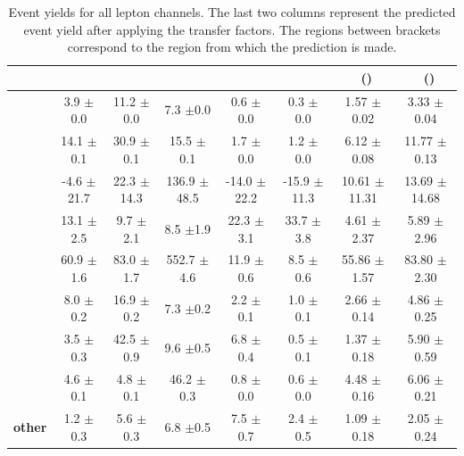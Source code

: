 \begin{landscape}
	\vspace*{\fill}
	\begin{table}[htb!]
	\begin{center}
				\caption{Event yields for all lepton channels. The last two columns represent the predicted event yield after applying the transfer factors. The regions between brackets correspond to the region from which the prediction is made.}
		
		\begin{tabular} {l ccccc|cc}
			\toprule
			& \STSR & \TTSR & \WZCR & \TTCR & \STCR & \STSR\ (\WZCR) & \TTSR\ (\WZCR)  \\ 
			\midrule 
			\textbf{\kZut} & 3.9 $\pm $0.0 & 11.2 $\pm $0.0 & 7.3 $\pm $0.0 & 0.6 $\pm $0.0 & 0.3 $\pm $0.0 & 1.57 $\pm $0.02 & 3.33 $\pm $0.04 \\ 
			\textbf{\kZct} & 14.1 $\pm $0.1 & 30.9 $\pm $0.1 & 15.5 $\pm $0.1 & 1.7 $\pm $0.0 & 1.2 $\pm $0.0 & 6.12 $\pm $0.08 & 11.77 $\pm $0.13 \\ 
			\textbf{\DY } & -4.6 $\pm $21.7 & 22.3 $\pm $14.3 & 136.9 $\pm $48.5 & -14.0 $\pm $22.2 & -15.9 $\pm $11.3 & 10.61 $\pm $11.31 & 13.69 $\pm $14.68 \\ 
			\textbf{\ttbar} & 13.1 $\pm $2.5 & 9.7 $\pm $2.1 & 8.5 $\pm $1.9 & 22.3 $\pm $3.1 & 33.7 $\pm $3.8 & 4.61 $\pm $2.37 & 5.89 $\pm $2.96  \\  
			\textbf{\WZ} & 60.9 $\pm $1.6 & 83.0 $\pm $1.7 & 552.7 $\pm $4.6 & 11.9 $\pm $0.6 & 8.5 $\pm $0.6 & 55.86 $\pm $1.57 & 83.80 $\pm $2.30 \\ 
			\textbf{\tZq} & 8.0 $\pm $0.2 & 16.9 $\pm $0.2 & 7.3 $\pm $0.2 & 2.2 $\pm $0.1 & 1.0 $\pm $0.1 & 2.66 $\pm $0.14 & 4.86 $\pm $0.25 \\ 
			\textbf{\ttZ} & 3.5 $\pm $0.3 & 42.5 $\pm $0.9 & 9.6 $\pm $0.5 & 6.8 $\pm $0.4 & 0.5 $\pm $0.1 & 1.37 $\pm $0.18 & 5.90 $\pm $0.59 \\ 
			\textbf{\ZZ} & 4.6 $\pm $0.1 & 4.8 $\pm $0.1 & 46.2 $\pm $0.3 & 0.8 $\pm $0.0 & 0.6 $\pm $0.0 & 4.48 $\pm $0.16 & 6.06 $\pm $0.21 \\ 
			\textbf{other} & 1.2 $\pm $0.3 & 5.6 $\pm $0.3 & 6.8 $\pm $0.5 & 7.5 $\pm $0.7 & 2.4 $\pm $0.5 & 1.09 $\pm $0.18 & 2.05 $\pm $0.24 \\ 
			\bottomrule
		\end{tabular}
	\end{center}
 \label{tab:yields}
\end{table}
\vspace*{\fill}
\end{landscape}
\clearpage
